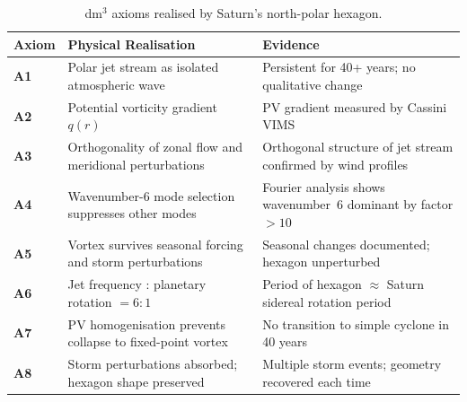 \documentclass[11pt, a4paper]{article}
\theoremstyle{definition}
\begin{document}
\begin{table}[H]
\centering
\small
\caption{dm$^3$ axioms realised by Saturn's north-polar hexagon.}
\label{tab:saturn}
\begin{tabular}{>{\bfseries}l p{5cm} p{5.5cm}}
\toprule
Axiom & Physical Realisation & Evidence \\
\midrule
A1 & Polar jet stream as isolated atmospheric wave & Persistent for 40+ years; no qualitative change \\[2pt]
A2 & Potential vorticity gradient $q(r)$ & PV gradient measured by Cassini VIMS \cite{Baines2009} \\[2pt]
A3 & Orthogonality of zonal flow and meridional perturbations & Orthogonal structure of jet stream confirmed by wind profiles \\[2pt]
A4 & Wavenumber-6 mode selection suppresses other modes & Fourier analysis shows wavenumber~6 dominant by factor $>10$ \\[2pt]
A5 & Vortex survives seasonal forcing and storm perturbations & Seasonal changes documented; hexagon unperturbed \cite{Fletcher2018} \\[2pt]
A6 & Jet frequency : planetary rotation $= 6{:}1$ & Period of hexagon $\approx$ Saturn sidereal rotation period \\[2pt]
A7 & PV homogenisation prevents collapse to fixed-point vortex & No transition to simple cyclone in 40 years \\[2pt]
A8 & Storm perturbations absorbed; hexagon shape preserved & Multiple storm events; geometry recovered each time \\
\bottomrule
\end{tabular}
\end{table}
\end{document}
